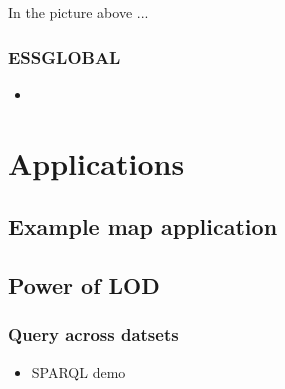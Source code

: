 In the picture above ...

\frame
{
  \frametitle{ESSGLOBAL}
  \begin{itemize}
    \item
  \end{itemize}
}
\section{Applications}
\subsection{Example map application}
\subsection{Power of LOD}
\frame
{
  \frametitle{Query across datsets}
  \begin{itemize}
    \item SPARQL demo
  \end{itemize}
}

